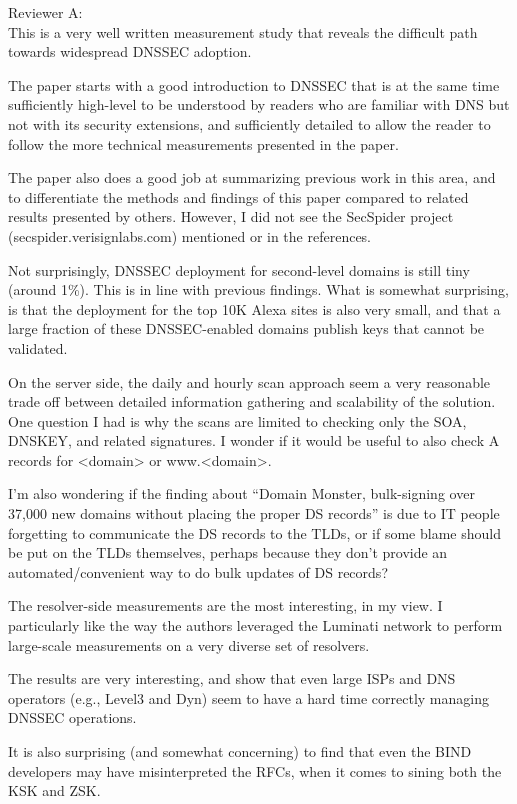 \documentclass[11pt]{article}
\begin{document}
\begin{description}
\footnotesize 
\item[] Reviewer A: \\

This is a very well written measurement study that reveals the difficult
        path towards widespread DNSSEC adoption.

The paper starts with a good introduction to DNSSEC that is at the same
        time sufficiently high-level to be understood by readers who are
        familiar with DNS but not with its security extensions, and
        sufficiently detailed to allow the reader to follow the more
        technical measurements presented in the paper.

The paper also does a good job at summarizing previous work in this
        area, and to differentiate the methods and findings of this
        paper compared to related results presented by others. However,
        I did not see the SecSpider project (secspider.verisignlabs.com)
        mentioned or in the references.

Not surprisingly, DNSSEC deployment for second-level domains is still
        tiny (around 1\%). This is in line with previous findings. What
        is somewhat surprising, is that the deployment for the top 10K
        Alexa sites is also very small, and that a large fraction of
        these DNSSEC-enabled domains publish keys that cannot be
        validated.

On the server side, the daily and hourly scan approach seem a very
        reasonable trade off between detailed information gathering and
        scalability of the solution. One question I had is why the scans
        are limited to checking only the SOA, DNSKEY, and related
        signatures. I wonder if it would be useful to also check A
        records for <domain> or www.<domain>.

I'm also wondering if the finding about ``Domain Monster, bulk-signing
        over 37,000 new domains without placing the proper DS records''
        is due to IT people forgetting to communicate the DS records to
        the TLDs, or if some blame should be put on the TLDs themselves,
        perhaps because they don't provide an automated/convenient way
        to do bulk updates of DS records?

The resolver-side measurements are the most interesting, in my view. I
        particularly like the way the authors leveraged the Luminati
        network to perform large-scale measurements on a very diverse
        set of resolvers.

The results are very interesting, and show that even large ISPs and DNS
        operators (e.g., Level3 and Dyn) seem to have a hard time
        correctly managing DNSSEC operations.

It is also surprising (and somewhat concerning) to find that even the
        BIND developers may have misinterpreted the RFCs, when it comes
        to sining both the KSK and ZSK.
\end{description}
\end{document}
